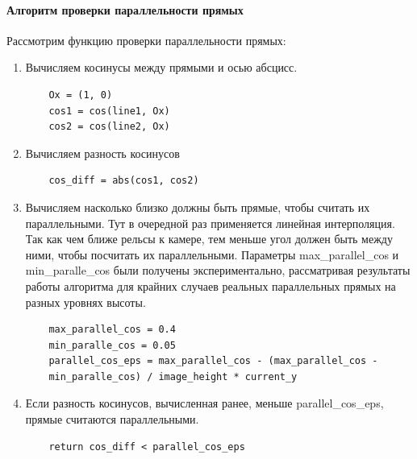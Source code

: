 \paragraph{Алгоритм проверки параллельности прямых}
Рассмотрим функцию проверки параллельности прямых:
\begin{enumerate}
	\item Вычисляем косинусы между прямыми и осью абсцисс.
	\begin{lstlisting}
	Ox = (1, 0)
	cos1 = cos(line1, Ox)
	cos2 = cos(line2, Ox)
	\end{lstlisting}
	\item Вычисляем разность косинусов
	\begin{lstlisting}
	cos_diff = abs(cos1, cos2)
	\end{lstlisting}
	\item Вычисляем насколько близко должны быть прямые, чтобы считать их параллельными. Тут в очередной раз применяется линейная интерполяция. Так как чем ближе рельсы к камере, тем меньше угол должен быть между ними, чтобы посчитать их параллельными. Параметры max\_parallel\_cos и min\_paralle\_cos были получены экспериментально, рассматривая результаты работы алгоритма для крайних случаев 
	реальных параллельных прямых на разных уровнях высоты.
	\begin{lstlisting}
	max_parallel_cos = 0.4
	min_paralle_cos = 0.05
	parallel_cos_eps = max_parallel_cos - (max_parallel_cos - 
	min_paralle_cos) / image_height * current_y
	\end{lstlisting}
	\item Если разность косинусов, вычисленная ранее, меньше parallel\_cos\_eps, прямые считаются параллельными.
	\begin{lstlisting}
	return cos_diff < parallel_cos_eps
	\end{lstlisting}
\end{enumerate}              
